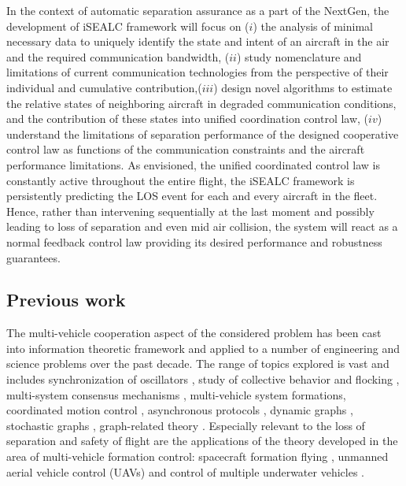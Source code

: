 \documentclass[letter,onecolumn,12pt]{aiaa-tc}
\newcommand{\1}{1_n}
\begin{document}
In the context of automatic separation assurance as a part of the NextGen, the development of iSEALC framework will focus on ($i$) the analysis of  minimal necessary data to uniquely identify the state and intent of an aircraft in the air and the required communication bandwidth, ($ii$) study nomenclature and limitations of current communication technologies from the perspective of their individual and cumulative contribution,($iii$) design novel algorithms to estimate the relative states of  neighboring aircraft in degraded communication conditions, and the contribution of these states into unified coordination control law, ($iv$) understand the limitations of separation performance of the designed cooperative control law as functions of the communication constraints and the aircraft performance limitations. As envisioned, the unified coordinated control law is constantly active throughout the entire flight, the iSEALC framework is persistently predicting the LOS event for each and every aircraft in the fleet. Hence, rather than intervening sequentially at the last moment and possibly leading to loss of separation and even mid air collision, the system will react as a normal feedback control law providing its desired performance and robustness guarantees.

\subsection{Previous work}
\label{subsec:envisioned_solution}
The multi-vehicle cooperation aspect of the considered problem has been cast into information theoretic framework and applied to a number of engineering and science problems over the past decade. The range of topics explored is vast and includes synchronization of oscillators \cite{Sepulchre}, study of collective behavior and flocking
\cite{jadbabaie03}, multi-system consensus mechanisms \cite{lin05}, multi-vehicle system formations\cite{egerstedt01},
coordinated motion control \cite{ghabcheloo06}, asynchronous protocols \cite{Fang}, dynamic graphs \cite{mesbahi},
stochastic graphs \cite{mesbahi, Stilwell, Stilwell2}, graph-related theory \cite{caom, Kim-Meshabi}.
Especially relevant to the loss of separation and safety of flight are the applications of the theory developed in the area of multi-vehicle formation control: spacecraft formation flying \cite{mesbahi-hadaegh}, unmanned aerial vehicle control (UAVs) \cite{Song, Stipanovic}and control of multiple underwater vehicles \cite{pereira}.
\end{document}
